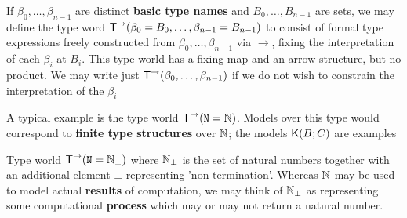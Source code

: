 \documentclass[11pt]{article}
\begin{document}
\begin{examplle}[]
If \(\beta_0,\dots,\beta_{n-1}\) are distinct \textbf{basic type names} and \(B_0,\dots,B_{n-1}\) are sets, we may define
the type word \(\textsf{T}^{\to}(\beta_0=B_0,\dots,\beta_{n-1}=B_{n-1})\) to consist of formal type expressions
freely constructed from \(\beta_0,\dots,\beta_{n-1}\) via \(\to\), fixing the interpretation of each \(\beta_i\)
at \(B_i\). This type world has a fixing map and an arrow structure, but no product. We may write
just \(\textsf{T}^{\to}(\beta_0,\dots,\beta_{n-1})\) if we do not wish to constrain the interpretation of the \(\beta_i\)

A typical example is the type world \(\textsf{T}^\to(\texttt{N}=\mathbb{N})\). Models over this type would correspond
to \textbf{finite type structures} over \(\mathbb{N}\); the models \(\textsf{K}(B;C)\) are examples

Type world \(\textsf{T}^{\to}(\texttt{N}=\mathbb{N}_\bot)\) where \(\mathbb{N}_\bot\) is the set of natural numbers together with an
additional element \(\bot\) representing 'non-termination'. Whereas \(\mathbb{N}\) may be used to model
actual \textbf{results} of computation, we may think of \(\mathbb{N}_\bot\) as representing some computational
\textbf{process} which may or may not return a natural number.
\end{examplle}
\end{document}
